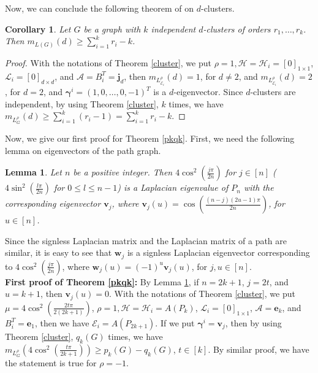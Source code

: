 \documentclass{amsart}
\newtheorem{corollary}[theorem]{Corollary}
\newtheorem{lemma}[theorem]{Lemma}
\theoremstyle{remark}
\begin{document}
Now, we can conclude the following theorem of \cite{GM} on $d$-clusters.
\begin{corollary}{\rm \cite{GM}}
 Let $G$ be a graph with $k$ independent $d$-clusters of orders $r_{1},\ldots,r_{k}$. Then $m_{L(G)}(d)\geq \sum_{i=1}^{k} r_i-k$.
 \end{corollary}
\begin{proof}
With the notations of Theorem \ref{cluster}, we put 
$\rho=1, \mathcal{H}=\mathcal{H}_{i}=[0]_{1\times 1}$, $\mathcal{L}_{i}=[0]_{d\times d}$, and  $\mathcal{A}=B_{i}^{T}=\pmb{j}_{d}$, then $m_{L_{\mathcal{E}_i}^{\rho}}(d)=1$, for $d\neq 2$, and $m_{L_{\mathcal{E}_i}^{\rho}}(d)=2$, for $d=2$,  and $\pmb{\gamma}^{i}=(1,0,\ldots,0,-1)^{T}$ is a $d$-eigenvector. Since $d$-clusters are independent, by using Theorem \ref{cluster}, $k$ times, we have 
$m_{L_{G}^{\rho}}(d)\geq \sum_{i=1}^{k} (r_i-1)= \sum_{i=1}^{k} r_i-k$.
\end{proof}
Now, we give our first proof for Theorem \ref{pkqk}. First, we need the following lemma on eigenvectors of the path graph.
\begin{lemma}{\rm \cite{Sp}}\label{pathvec}
Let $n$ be a positive integer. Then $\displaystyle 4\cos^{2}(\frac{j\pi}{2n})$ for $j\in [n]$ {\rm (}$\displaystyle 4\sin^{2}(\frac{l\pi}{2n})$ for $0\leq l\leq n-1${\rm )} is a Laplacian eigenvalue of $P_n$ with the corresponding eigenvector $\pmb{v}_j$, where $\pmb{v}_{j}(u)=\cos(\frac{(n-j)(2u-1)\pi}{2n})$, for $u\in [n]$.
\end{lemma}
Since the signless Laplacian matrix and the Laplacian matrix of a path are similar, it is easy to see that $\pmb{w}_{j}$ is a  signless Laplacian eigenvector corresponding to  $4\cos^{2}(\frac{j\pi}{2n})$, where $\pmb{w}_{j}(u)=(-1)^{u}\pmb{v}_{j}(u)$, for $j,u\in [n]$.\\

{\noindent \textbf{First proof of Theorem \ref{pkqk}:}
By Lemma \ref{pathvec}, if $n=2k+1$, $j=2t$, and $u=k+1$, then $\pmb{v}_{j}(u)=0$. With the notations of Theorem \ref{cluster}, we put $\mu=4\cos^{2}(\frac{2t\pi}{2(2k+1)})$, $\rho=1, \mathcal{H}=\mathcal{H}_{i}=A(P_{k})$, $\mathcal{L}_{i}=[0]_{1\times 1}$, $\mathcal{A}=\pmb{e}_{k}$, and $B_{i}^{T}=\pmb{e}_{1}$, then we have $\mathcal{E}_{i}=A(P_{2k+1})$. If we put $\pmb{\gamma}^{i}=\pmb{v}_{j}$, then by using Theorem \ref{cluster}, $q_{k}(G)$ times, we have $m_{L_{G}^{\rho}}(4\cos^{2}(\frac{t\pi}{2k+1}))\geq p_{k}(G)-q_{k}(G)$, $t\in [k]$. By similar proof, we have the statement is true for $\rho=-1$.
}
\end{document}
